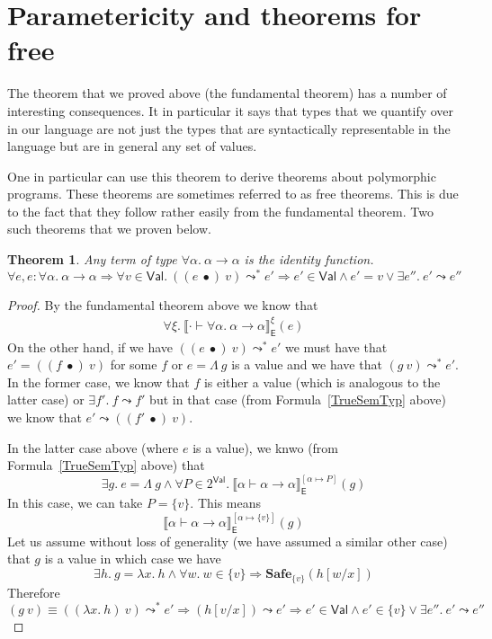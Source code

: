 \documentclass{article}
\newtheorem{theorem}{Theorem}
\newcommand{\EXP}{\mathsf{E}}
\newcommand{\VAL}{\mathsf{Val}}
\newcommand{\semtyp}[2]{\llbracket #2 \rrbracket_{#1}}
\begin{document}
\section{Parametericity and theorems for free}
The theorem that we proved above (the fundamental theorem)
has a number of interesting consequences.
It in particular it says that types that we quantify over in our
language are not just the types that are syntactically
representable in the language but are in general any set of
values.

One in particular can use this theorem to derive theorems about
polymorphic programs.
These theorems are sometimes referred to as free theorems. This is due to the fact that they follow rather easily from the
fundamental theorem.
Two such theorems that we proven below.

\begin{theorem}
Any term of type $\forall \alpha.~\alpha \to \alpha$ is the identity function.
\[
\forall e, e : \forall \alpha.~\alpha \to \alpha \Rightarrow
\forall v \in \VAL.~((e~\bullet)~v) \leadsto^* e' \Rightarrow
e' \in \VAL \land e' = v \lor \exists e''.~e' \leadsto e''
\]
\end{theorem}

\begin{proof}
By the fundamental theorem above we know that
\begin{align}
\forall \xi.~ \semtyp{\EXP}{\cdot \vdash \forall \alpha.~\alpha \to \alpha}^{\xi}(e)
\label{TrueSemTyp}
\end{align}
On the other hand, if we have $((e~\bullet)~v) \leadsto^* e'$ we must have
that $e' = ((f~\bullet)~v)$ for some $f$ or $e = \Lambda~g$ is a value and
we have that $(g~v) \leadsto^* e'$.
In the former case, we know that $f$ is either a value (which is analogous to the latter case) or $\exists f'.~f \leadsto f'$ but in that
case (from Formula~\ref{TrueSemTyp} above) we know that
$e' \leadsto ((f'~\bullet)~v)$.

In the latter case above (where $e$ is a value), we knwo
(from Formula~\ref{TrueSemTyp} above) that
\[
\exists g.~e = \Lambda~g \land
\forall P\in 2^{\VAL}.~\semtyp{\EXP}{\alpha \vdash \alpha \to \alpha}^{[\alpha \mapsto P]}(g)
\]
In this case, we can take $P = \{v\}$. This means
\[
\semtyp{\EXP}{\alpha \vdash \alpha \to \alpha}^{[\alpha \mapsto \{v\}]}(g)
\]
Let us assume without loss of generality (we have assumed a similar other case) that $g$ is a value in which case we have
\[
\exists h.~ g = \lambda x.~h \land \forall w.~ w \in \{v\}
\Rightarrow \mathbf{Safe}_{\{v\}}(h[w/x])
\]
Therefore
\[
(g~v) \equiv ((\lambda x.~h)~v) \leadsto^* e' \Rightarrow
(h[v/x]) \leadsto e' \Rightarrow
e' \in \VAL \land e' \in \{v\} \lor \exists e''.~e' \leadsto e''
\]
\end{proof}
\end{document}
